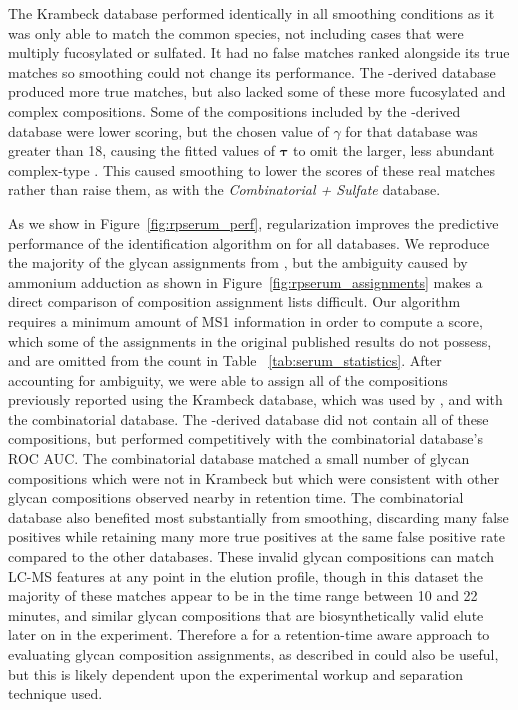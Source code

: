     The Krambeck database performed identically in all smoothing conditions as it
    was only able to match the common species, not including cases that were multiply
    fucosylated or sulfated. It had no false matches ranked alongside its true matches so
    smoothing could not change its performance. The \glyspace-derived database produced more true
    matches, but also lacked some of these more fucosylated and complex compositions. Some of the
    compositions included by the \glyspace-derived database were lower scoring, but the chosen
    value of $\gamma$ for that database was greater than 18, causing the fitted values of $\mathbf{\tau}$
    to omit the larger, less abundant complex-type \nglycans. This caused smoothing to lower the scores
    of these real matches rather than raise them, as with the \textit{Combinatorial + Sulfate} database.

    As we show in Figure~\ref{fig:rpserum_perf}, regularization improves the
    predictive performance of the identification algorithm on \rpserum for all databases.
    We reproduce the majority of the glycan assignments from \citealp{Yu2013}, but the ambiguity
    caused by ammonium adduction as shown in Figure~\ref{fig:rpserum_assignments} makes a
    direct comparison of composition assignment lists difficult. Our algorithm requires a minimum
    amount of MS1 information in order to compute a score, which some of the assignments in the
    original published results do not possess, and are omitted from the count in Table~
    \ref{tab:serum_statistics}. After accounting for ambiguity, we were able to assign all
    of the compositions previously reported using the Krambeck database, which was used
    by \citealp{Yu2013}, and with the combinatorial database. The \glyspace-derived database did not
    contain all of these compositions, but performed competitively with the combinatorial
    database's ROC AUC. The combinatorial database matched a small number of glycan compositions
    which were not in Krambeck but which were consistent with other glycan compositions
    observed nearby in retention time. The combinatorial database also benefited most
    substantially from smoothing, discarding many false positives while retaining many more
    true positives at the same false positive rate compared to the other databases. These
    invalid glycan compositions can match LC-MS features at any point in the elution profile,
    though in this dataset the majority of these matches appear to be in the time range between
    10 and 22 minutes, and similar glycan compositions that are biosynthetically valid elute
    later on in the experiment. Therefore a for a retention-time aware approach to evaluating glycan
    composition assignments, as described in \citealp{Hu2016} could also be useful, but this is
    likely dependent upon the experimental workup and separation technique used.

